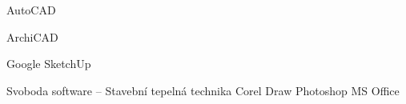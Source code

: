 

\begin{cvskills}

  
  \cvskill
    {AutoCAD} %
    {\faCircle\faCircle\faCircle\faCircle\faCircleO}

    
  \cvskill
    {ArchiCAD} %
    {\faCircle\faCircle\faCircle\faCircleO\faCircleO} %
  
  \cvskill
    {Google SketchUp} %
    {\faCircle\faCircle\faCircle\faCircle\faCircleO} %

  \cvskill
    {Svoboda software – Stavební tepelná technika}
    {\faCircle\faCircle\faCircle\faCircle\faCircleO}
    \cvskill
    {Corel Draw}
    {\faCircle\faCircle\faCircle\faCircleO\faCircleO}
    \cvskill
    {Photoshop}
    {\faCircle\faCircle\faCircleO\faCircleO\faCircleO}
    \cvskill
    {MS Office}
    {\faCircle\faCircle\faCircle\faCircle\faCircleO}
\end{cvskills}
